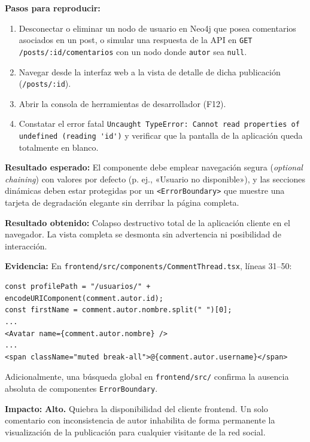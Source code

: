 \documentclass[10pt,a4paper]{article}
\newcommand{\code}[1]{\nolinkurl{#1}}
\begin{document}
\noindent\textbf{Pasos para reproducir:}
\begin{enumerate}[leftmargin=*]
    \item Desconectar o eliminar un nodo de usuario en Neo4j que posea comentarios asociados en un post, o simular una respuesta de la API en \code{GET /posts/:id/comentarios} con un nodo donde \code{autor} sea \code{null}.
    \item Navegar desde la interfaz web a la vista de detalle de dicha publicación (\code{/posts/:id}).
    \item Abrir la consola de herramientas de desarrollador (F12).
    \item Constatar el error fatal \code{Uncaught TypeError: Cannot read properties of undefined (reading 'id')} y verificar que la pantalla de la aplicación queda totalmente en blanco.
\end{enumerate}

\noindent\textbf{Resultado esperado:}
El componente debe emplear navegación segura (\textit{optional chaining}) con valores por defecto (p. ej., «Usuario no disponible»), y las secciones dinámicas deben estar protegidas por un \code{<ErrorBoundary>} que muestre una tarjeta de degradación elegante sin derribar la página completa.

\noindent\textbf{Resultado obtenido:}
Colapso destructivo total de la aplicación cliente en el navegador. La vista completa se desmonta sin advertencia ni posibilidad de interacción.

\noindent\textbf{Evidencia:}
En \code{frontend/src/components/CommentThread.tsx}, líneas 31--50:
\begin{tcolorbox}[colback=codebg,colframe=gray!40,arc=1mm]\small
\begin{verbatim}
const profilePath = "/usuarios/" + encodeURIComponent(comment.autor.id);
const firstName = comment.autor.nombre.split(" ")[0];
...
<Avatar name={comment.autor.nombre} />
...
<span className="muted break-all">@{comment.autor.username}</span>
\end{verbatim}
\end{tcolorbox}
Adicionalmente, una búsqueda global en \code{frontend/src/} confirma la ausencia absoluta de componentes \code{ErrorBoundary}.

\noindent\textbf{Impacto:}
\textbf{Alto.} Quiebra la disponibilidad del cliente frontend. Un solo comentario con inconsistencia de autor inhabilita de forma permanente la visualización de la publicación para cualquier visitante de la red social.
\end{document}
